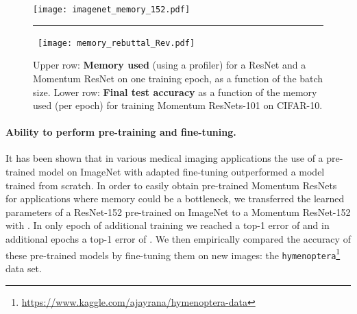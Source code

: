 \documentclass{article}
\begin{document}
 \begin{figure}[ht]
 \center  \texttt{[image: imagenet\_memory\_152.pdf]}
 \vspace{0.5em}
  \unskip\ \hrule\
  \texttt{[image: memory\_rebuttal\_Rev.pdf]}  \caption{Upper row: \textbf{Memory used} (using a profiler) for a ResNet and a Momentum ResNet on one training epoch, as a function of the batch size.  Lower row: \textbf{Final test accuracy} as a function of the memory used (per epoch) for training Momentum ResNets-101 on CIFAR-10.} 
 \label{fig:memory_time} 
 \end{figure}
\paragraph{Ability to perform pre-training and fine-tuning.}

It has been shown \citep{tajbakhsh2016convolutional} that in various medical imaging applications the use of a pre-trained model on ImageNet
with adapted fine-tuning outperformed a model trained from scratch. In order to easily obtain pre-trained Momentum ResNets for applications where memory could be a bottleneck, we transferred the learned parameters of a ResNet-152 pre-trained on ImageNet to a Momentum ResNet-152 with . In only  epoch of additional training we reached a top-1 error of  and in  additional epochs a top-1 error of . We then empirically compared the accuracy of these pre-trained models by fine-tuning them on new images: the \texttt{hymenoptera}\footnote{\href{url}{https://www.kaggle.com/ajayrana/hymenoptera-data}} data set. 
\end{document}

